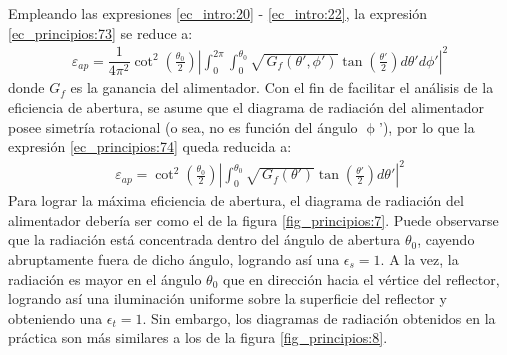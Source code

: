 Empleando las expresiones \eqref{ec_intro:20} - \eqref{ec_intro:22}, la expresión \eqref{ec_principios:73} se reduce a:
\begin{align}
\varepsilon_{ap}  = \dfrac{1}{4\pi ^2}\cot^2\left(\frac{\theta_0}{2}\right)\left|\displaystyle\int_0^{2\pi}\!\!\!\int_0^{\theta_0}\! \sqrt{\,G_f\left(\theta ',\phi '\right)}\tan\left(\frac{\theta '}{2}\right)\!d\theta 'd\phi '\right|^2
\label{ec_principios:74}
\end{align}
donde $G_f$ es la ganancia del alimentador. Con el fin de facilitar el análisis de la eficiencia de abertura, se asume que el diagrama de radiación del alimentador posee simetría rotacional (o sea, no es función del ángulo $\upphi$'), por lo que la expresión \eqref{ec_principios:74} queda reducida a:
\begin{align}
\varepsilon_{ap}  = \cot^2\left(\frac{\theta_0}{2}\right)\left|\displaystyle\int_0^{\theta_0}\! \sqrt{\,G_f\left(\theta '\right)}\tan\left(\frac{\theta '}{2}\right)\!d\theta '\right|^2
\label{ec_principios:75}
\end{align}
Para lograr la máxima eficiencia de abertura, el diagrama de radiación del alimentador debería ser como el de la figura \ref{fig_principios:7}. Puede observarse que la radiación está concentrada dentro del ángulo de abertura $\theta_0$, cayendo abruptamente fuera de dicho ángulo, logrando así una $\epsilon_s = 1$. A la vez, la radiación es mayor en el ángulo $\theta_0$ que en dirección hacia el vértice del reflector, logrando así una iluminación uniforme sobre la superficie del reflector y obteniendo una $\epsilon_t = 1$. Sin embargo, los diagramas de radiación obtenidos en la práctica son más similares a los de la figura \ref{fig_principios:8}.
